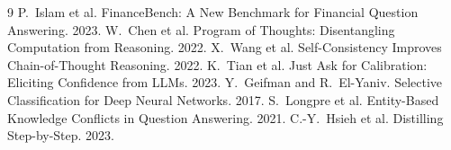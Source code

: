 \documentclass[sigconf,nonacm]{acmart}
\begin{document}
\begin{thebibliography}{9}
 P.~Islam et al. FinanceBench: A New Benchmark for Financial Question Answering. 2023.
 W.~Chen et al. Program of Thoughts: Disentangling Computation from Reasoning. 2022.
 X.~Wang et al. Self-Consistency Improves Chain-of-Thought Reasoning. 2022.
 K.~Tian et al. Just Ask for Calibration: Eliciting Confidence from LLMs. 2023.
 Y.~Geifman and R.~El-Yaniv. Selective Classification for Deep Neural Networks. 2017.
 S.~Longpre et al. Entity-Based Knowledge Conflicts in Question Answering. 2021.
 C.-Y.~Hsieh et al. Distilling Step-by-Step. 2023.
\end{thebibliography}
\end{document}
